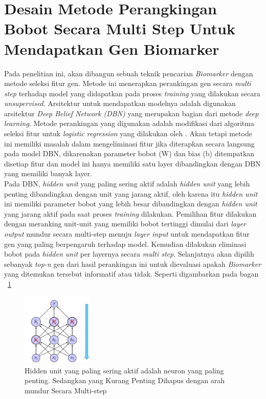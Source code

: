 \section{Desain Metode Perangkingan Bobot Secara Multi Step Untuk Mendapatkan Gen Biomarker}
Pada penelitian ini, akan dibangun sebuah teknik pencarian \textit{Biomarker} dengan metode seleksi fitur gen. Metode ini menerapkan perankingan gen secara \textit{multi step} terhadap model yang didapatkan pada proses \textit{training} yang dilakukan secara \textit{unsupervised}. Arsitektur untuk mendapatkan modelnya adalah digunakan  arsitektur \textit{Deep Belief Network (DBN)} yang merupakan bagian dari metode \textit{deep learning}. Metode perankingan yang digunakan adalah modifikasi dari algoritma seleksi fitur untuk \textit{logistic regression} yang dilakukan oleh \cite{shevade2003simple}. Akan tetapi metode ini memiliki masalah dalam  mengeliminasi fitur jika diterapkan secara langsung pada model DBN, dikarenakan parameter bobot (W) dan bias (b) ditempatkan disetiap fitur dan model ini hanya memiliki satu layer dibandingkan dengan DBN yang memiliki banyak layer. \\
Pada DBN, \textit{hidden unit} yang paling sering aktif adalah \textit{hidden unit} yang lebih penting dibandingkan dengan unit yang jarang aktif, oleh karena itu \textit{hidden unit} ini memiliki parameter bobot yang lebih besar dibandingkan dengan \textit{hidden unit} yang jarang aktif pada saat proses \textit{training} dilakukan. Pemilihan fitur dilakukan dengan meranking unit-unit yang memiliki bobot tertinggi dimulai dari \textit{layer output} mundur secara multi-step menuju \textit{layer input} untuk mendapatkan fitur gen yang paling berpengaruh terhadap model. Kemudian dilakukan eliminasi bobot pada \textit{hidden unit} per layernya secara \textit{multi step}. Selanjutnya akan dipilih sebanyak \textit{top-n} gen dari hasil perankingan ini untuk dievaluasi apakah \textit{Biomarker} yang ditemukan tersebut informatif atau tidak. Seperti digambarkan pada bagan \pic~\ref{fig:multistep1} \\

\begin{figure}
	\centering
	\includegraphics[width=0.3\textwidth]
		{pics/multistep1.png}
	\caption{Hidden unit yang paling sering aktif adalah neuron yang paling penting. Sedangkan yang Kurang Penting Dihapus dengan arah mundur Secara Multi-step \citep{duh2014deep}}
	\label{fig:multistep1}
\end{figure}

